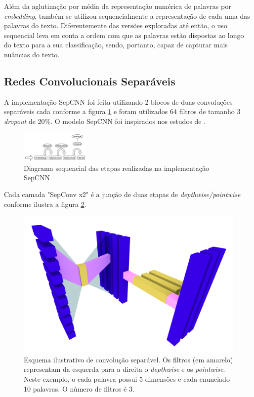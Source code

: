 Além da aglutinação por média da representação numérica de palavras por \textit{embedding}, também se utilizou sequencialmente a representação de cada uma das palavras do texto. Diferentemente das versões exploradas até então, o uso sequencial leva em conta a ordem com que as palavras estão dispostas ao longo do texto para a sua classificação, sendo, portanto, capaz de capturar mais nuâncias do texto.

\subsection{Redes Convolucionais Separáveis}

A implementação SepCNN foi feita utilizando 2 blocos de duas convoluções separáveis cada conforme a figura \ref{fig:sepcnn_overview} e foram utilizados 64 filtros de tamanho 3 \textit{dropout} de 20\%. O modelo SepCNN foi inspirados nos estudos de \cite{DBLP:journals/corr/Chollet16a}.

\begin{figure}[!ht]
	\centering
	\includegraphics[width=0.3\textwidth]{figures/sepcnn_overview.png}
	\caption{Diagrama sequencial das etapas realizadas na implementação SepCNN}
	\label{fig:sepcnn_overview}
\end{figure}

Cada camada "SepConv x2" é a junção de duas etapas de \textit{depthwise/pointwise} conforme ilustra a figura \ref{fig:sepcnn_detail}.

\begin{figure}[!ht]
	\centering
	\includegraphics[width=\textwidth]{figures/sepcnn.png}
	\caption{Esquema ilustrativo de convolução separável. Os filtros (em amarelo) representam da esquerda para a direita o \textit{depthwise} e os \textit{pointwise}. Neste exemplo, o cada palavra possui 5 dimensões e cada enunciado 10 palavras. O número de filtros é 3.}
	\label{fig:sepcnn_detail}
\end{figure}

